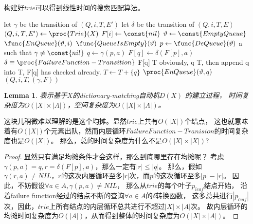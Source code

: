 \documentclass[UTF8]{ctexart}
\newtheorem{lem}[thm]{Lemma}
\theoremstyle{definition}
\theoremstyle{remark}
\numberwithin{equation}{subsection}
\begin{document}
	构建好$trie$可以得到线性时间的搜索匹配算法。
    \begin{codebox}
	\zi	\Comment let $\gamma$ be the transition of $(Q, i, T, E')$
	\zi \Comment let $\delta$ be the transition of $(Q, i, T, E)$
	\li $(Q, i, T, E') \gets \proc{Trie}(X)$
	\li $F[i] \gets \const{nil}$
	\li $\vartheta \gets \const{EmptyQueue}$
	\li $\func{EnQueue}(\vartheta, i)$
	\li \While {} $\func{QueueIsEmpty}(\vartheta)$
	\li		\Do
				$p \gets \func{DeQueue}(\vartheta)$
	\li			\For a such that $\gamma \neq \const{nil}$
	\li				\Do
						$q \gets \gamma(p, a)$
	\li					$F[q] \gets \delta(F[p], a)$
	\li					\Comment $\delta \equiv \proc{FailureFunction-Transition}$
	\li					\If F[q] \kw{in} T
	\li					\Comment obviously, \If q  T, then append q into T, F[q] has checked already.
	\li						\Then $T \gets T + \{q\}$
							\End
	\li					$\proc{EnQueue}(\vartheta, q)$
					\End
			\End
	\li \Return $(Q, i, T, (\gamma, F))$
    \end{codebox}

	\begin{lem}
		表示基于$X$的dictionary-matching自动机$D(X)$ 的建立过程，
		时间复杂度为$O(|X|\times|A|)$，空间复杂度为$O(|X|\times|A|)$。
	\end{lem}
	
	这块儿稍微难以理解的是这个均摊。显然$trie$上共有$O(|X|)$个结点，
	这也就意味着有$O(|X|)$个元素出队，然而内层循环$FailureFunction-Tranision$的时间复杂度也是$O(|X|)$。
	那么，总的时间复杂度为什么不是$O(|X|\times|X|)$?
	\begin{proof}
		显然只有满足均摊条件才会这样，那么到底哪里存在均摊呢？
		考虑$\gamma(p,a) = q, r = \delta(F[p], a)$，那么一定有$|r| \le |q|$。
		那么，假如$\gamma(r,a) \neq NIL$，$r$的这次内层循环至多$|r|$次，而$p$的这次循环至多$|p|-|r|$。
		因此，不妨假设$\forall a \in A, \gamma(p,a) \neq NIL$，
		那么从$trie$的每个叶子$p_{leaf}$结点开始，
		沿着failure function经过的结点不断的查询$\forall a \in A$的$\delta$转换函数，
		这多总共进行$|p_{leaf}|$次，因此，$trie$上所有结点的内层循环总共进行不超过$|X| \times |A|$次。
		故内层循环的均摊时间复杂度为$O(|A|)$，从而得到整体的时间复杂度为$O(|X|\times|A|)$。
	\end{proof}
	
\end{document}
